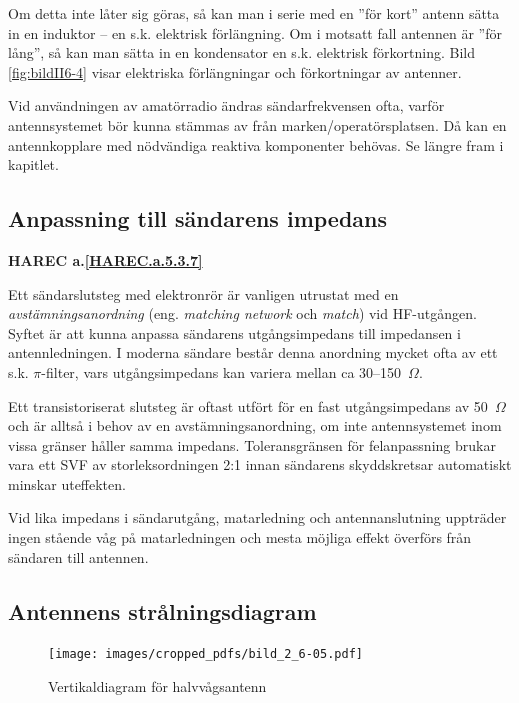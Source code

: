 Om detta inte låter sig göras, så kan man i serie med en ''för kort''
antenn sätta in en induktor -- en s.k. elektrisk förlängning.
Om i motsatt fall antennen är ''för lång'', så kan man sätta in en
kondensator en s.k. elektrisk förkortning.
Bild \ref{fig:bildII6-4} visar elektriska förlängningar och förkortningar av
antenner.

Vid användningen av amatörradio ändras sändarfrekvensen ofta, varför
antennsystemet bör kunna stämmas av från marken/operatörsplatsen.
Då kan en antennkopplare med nödvändiga reaktiva komponenter behövas.
Se längre fram i kapitlet.

\subsection{Anpassning till sändarens impedans}
\textbf{
HAREC a.\ref{HAREC.a.5.3.7}\label{myHAREC.a.5.3.7}
}

Ett sändarslutsteg med elektronrör är vanligen utrustat med en
\emph{avstämningsanordning} (eng. \emph{matching network} och \emph{match})
vid HF-utgången.
Syftet är att kunna anpassa sändarens utgångsimpedans till impedansen i
antennledningen.
I moderna sändare består denna anordning mycket ofta av ett s.k.
\(\pi \)-filter, vars utgångsimpedans kan variera mellan ca 30--150~\(\Omega\).

Ett transistoriserat slutsteg är oftast utfört för en fast utgångsimpedans av
50~\(\Omega\) och är alltså i behov av en avstämningsanordning, om inte
antennsystemet inom vissa gränser håller samma impedans.
Toleransgränsen för felanpassning brukar vara ett SVF av storleksordningen 2:1
innan sändarens skyddskretsar automatiskt minskar uteffekten.

Vid lika impedans i sändarutgång, matarledning och antennanslutning
uppträder ingen stående våg på matarledningen och mesta möjliga effekt
överförs från sändaren till antennen.

\subsection{Antennens strålningsdiagram}

\begin{figure}
  \texttt{[image: images/cropped\_pdfs/bild\_2\_6-05.pdf]}
  \caption{Vertikaldiagram för halvvågsantenn}
  \label{fig:bildII6-5}
\end{figure}

